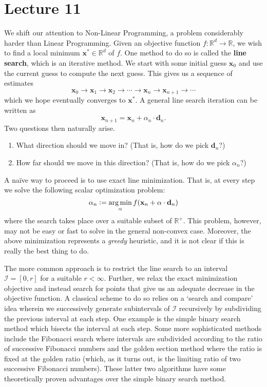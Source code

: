 \section{Lecture 11}

We shift our attention to Non-Linear Programming, a problem considerably harder than Linear Programming. Given an objective function $f \colon \mathbb{R}^d \to \mathbb{R}$, we wish to find a local minimum $\mathbf{x}^* \in \mathbb{R}^d$ of $f$. One method to do so is called the \textbf{line search}, which is an iterative method. We start with some initial guess $\mathbf{x}_0$ and use the current guess to compute the next guess. This gives us a sequence of estimates
\[
    \mathbf{x}_0 \to \mathbf{x}_1 \to \mathbf{x}_2 \to \cdots \to \mathbf{x}_n \to \mathbf{x}_{n+1} \to \cdots
\]
which we hope eventually converges to $\mathbf{x}^*$. A general line search iteration can be written as
\[
    \mathbf{x}_{n+1} = \mathbf{x}_n + \alpha_n \cdot \mathbf{d}_n.
\]
Two questions then naturally arise.
\begin{enumerate}
    \item What direction should we move in? (That is, how do we pick $\mathbf{d}_n$?)
    \item How far should we move in this direction? (That is, how do we pick $\alpha_n$?)
\end{enumerate}

A naïve way to proceed is to use exact line minimization. That is, at every step we solve the following scalar optimization problem:
\[
    \alpha_n \vcentcolon= \operatorname*{arg\,min}_{\alpha} f(\mathbf{x}_n + \alpha \cdot \mathbf{d}_n)
\]
where the search takes place over a suitable subset of $\mathbb{R}^+$. This problem, however, may not be easy or fast to solve in the general non-convex case. Moreover, the above minimization represents a \textit{greedy} heuristic, and it is not clear if this is really the best thing to do.

The more common approach is to restrict the line search to an interval $\mathcal{I} = [0,r]$ for a suitable $r < \infty$. Further, we relax the exact minimization objective and instead search for points that give us an adequate decrease in the objective function. A classical scheme to do so relies on a `search and compare' idea wherein we successively generate subintervals of $\mathcal{I}$ recursively by subdividing the previous interval at each step. One example is the simple binary search method which bisects the interval at each step. Some more sophisticated methods include the Fibonacci search where intervals are subdivided according to the ratio of successive Fibonacci numbers and the golden section method where the ratio is fixed at the golden ratio (which, as it turns out, is the limiting ratio of two successive Fibonacci numbers). These latter two algorithms have some theoretically proven advantages over the simple binary search method.

